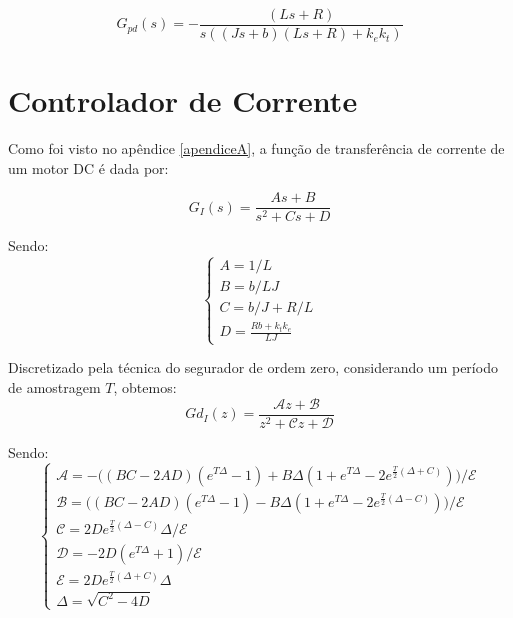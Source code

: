 \documentclass[]{politex}
\begin{document}
\begin{itemize}
    \begin{equation}
    \label{FunctionMotord}
     G_{pd}(s) = - \frac{(L s + R)}{s((J s + b)(L s + R) + k_{e} k_{t})}
    \end{equation}


\end{itemize}

\chapter{Controlador de Corrente} \label{apendiceC}

Como foi visto no apêndice \ref{apendiceA}, a função de transferência de corrente de um motor DC é dada por:

\begin{equation} \label{functionTransferMotorCorrente}
G_{I}(s) = \frac{A s+B}{s^2 + C s + D}
\end{equation}

Sendo:
\begin{equation}
\begin{cases}
A = 1/L \\
B = b/LJ \\
C = b/J + R/L \\
D = \frac{Rb + k_t k_e}{LJ}
\end{cases}
\end{equation}

Discretizado pela técnica do segurador de ordem zero, considerando um período de amostragem $T$, obtemos:
\begin{equation}
Gd_{I}(z) = \frac{\mathcal{A} z + \mathcal{B}}{z^2 + \mathcal{C} z + \mathcal{D}}
\end{equation}

Sendo:
\begin{equation}
\begin{cases}
\mathcal{A} = -  \Big( (BC - 2AD)(e^{T \Delta} -1) + B \Delta (1 + e^{T \Delta} - 2 e^{\frac{T}{2}(\Delta+C)} ) \Big) / \mathcal{E}\\
\mathcal{B} =   \Big( (BC - 2AD)(e^{T \Delta} -1) - B \Delta (1 + e^{T \Delta} - 2 e^{\frac{T}{2}(\Delta-C)} ) \Big) / \mathcal{E} \\
\mathcal{C} = 2 D  e^{\frac{T}{2}  (\Delta - C )} \Delta / \mathcal{E} \\
\mathcal{D} = -2 D  \left(e^{T \Delta}+1\right) / \mathcal{E} \\
\mathcal{E} = 2 D  e^{\frac{T}{2}(\Delta + C)} \Delta \\
\Delta = \sqrt{C^2 - 4D}
\end{cases}
\end{equation}
\end{document}
